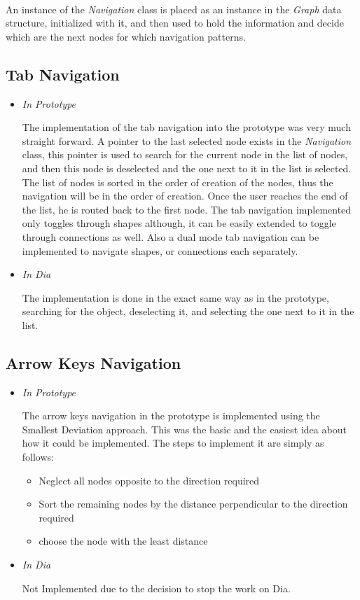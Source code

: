 \paragraph{}
An instance of the {\it Navigation} class is placed as an instance in the {\it Graph} data structure, initialized with it, and then used to hold the information and decide which are the next nodes for which navigation patterns.


\subsection{Tab Navigation}
\begin{itemize}
\item {\it In Prototype}
\par \noindent
The implementation of the tab navigation into the prototype was very much straight forward. A pointer to the last selected node exists in the {\it Navigation} class, this pointer is used to search for the current node in the list of nodes, and then this node is deselected and the one next to it in the list is selected. The list of nodes is sorted in the order of creation of the nodes, thus the navigation will be in the order of creation. Once the user reaches the end of the list, he is routed back to the first node. The tab navigation implemented only toggles through shapes although, it can be easily extended to toggle through connections as well. Also a dual mode tab navigation can be implemented to navigate shapes, or connections each separately.

\item {\it In Dia}
\par \noindent
The implementation is done in the exact same way as in the prototype, searching for the object, deselecting it, and selecting the one next to it in the list.
\end{itemize}


\subsection{Arrow Keys Navigation}
\begin{itemize}
\item {\it In Prototype}
\par \noindent
The arrow keys navigation in the prototype is implemented using the Smallest Deviation approach. This was the basic and the easiest idea about how it could be implemented.
The steps to implement it are simply as follows:
\begin{itemize}
\item Neglect all nodes opposite to the direction required
\item Sort the remaining nodes by the distance perpendicular to the direction required
\item choose the node with the least distance
\end{itemize}

\item {\it In Dia}
\par \noindent
Not Implemented due to the decision to stop the work on Dia.
\end{itemize}

